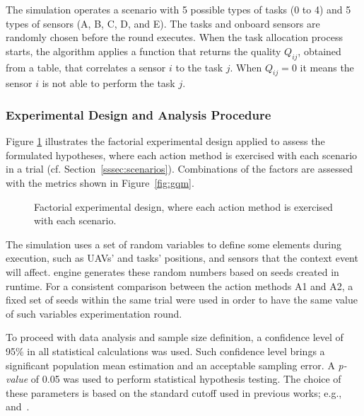 

The simulation operates a scenario with 5 possible types of tasks (0 to 4) and 5 types of sensors (A, B, C, D, and E). The tasks and onboard sensors are randomly chosen \color{black}before the round executes\color{black}. When the \color{black} task allocation \color{black}process starts, the algorithm applies a function that returns the quality $Q_{ij}$, obtained from a table, that correlates a sensor $i$ to the task $j$. When $Q_{ij}=0$ it means the sensor $i$ is not able to perform the task $j$.



\subsubsection{Experimental Design and Analysis Procedure}
\label{sssec:design}


Figure \ref{fig:exp_design} illustrates the factorial experimental design applied to assess the formulated hypotheses, where each action method is exercised with each scenario in a trial (cf. Section~\ref{sssec:scenarios}). Combinations of the factors are assessed with the metrics shown in Figure~\ref{fig:gqm}.


\begin{figure}[ht]
    \centering
    \scalebox{.6}{}
    \caption{Factorial experimental design, where each action method is exercised with each scenario.}
    \label{fig:exp_design}
\end{figure}


The simulation uses a set of random variables to define some elements during execution, such as UAVs’ and tasks’ positions, and sensors that the context event will affect.  engine generates these random numbers based on seeds created in runtime. For a consistent comparison between the action methods A1 and A2, a fixed set of seeds within the same trial were used in order to have the same value of such variables  experimentation round.

To proceed with data analysis and sample size definition, a confidence level of 95\% in all statistical calculations was used. Such confidence level brings a significant population mean estimation and an acceptable sampling error. A \emph{p-value} of 0.05 was used to perform statistical hypothesis testing. The choice of these parameters is based on the standard cutoff used in \color{black}previous works; e.g.,~\citet{CochranW.G.1983} and~\citet{Bruce2014}. \color{black}


